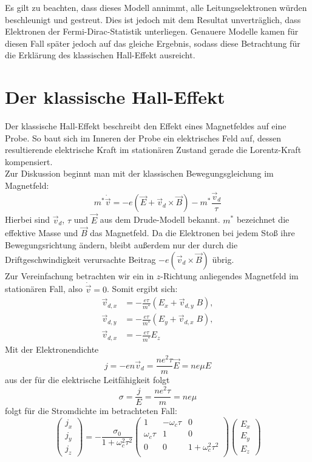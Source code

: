 Es gilt zu beachten, dass dieses Modell annimmt, alle Leitungselektronen würden
beschleunigt und gestreut. Dies ist jedoch mit dem Resultat unverträglich, dass
Elektronen der Fermi-Dirac-Statistik unterliegen. Genauere Modelle kamen für diesen
Fall später jedoch auf das gleiche Ergebnis, sodass diese Betrachtung für die 
Erklärung des klassischen Hall-Effekt ausreicht. \cite{hunklinger}

\section{Der klassische Hall-Effekt}

Der klassische Hall-Effekt beschreibt den Effekt eines Magnetfeldes auf eine
Probe. So baut sich im Inneren der Probe ein elektrisches Feld auf, dessen
resultierende elektrische Kraft im stationären Zustand gerade die Lorentz-Kraft
kompensiert.\\
Zur Diskussion beginnt man mit der klassischen Bewegungsgleichung im Magnetfeld:
\[
    m^* \dot{\vec{v}} = - e \left( \vec{E} + \vec{v}_d \times \vec{B} \right)
                      - m^* \frac{\vec{v}_d}{\tau}
\]
Hierbei sind $\vec{v}_d$, $\tau$ und $\vec{E}$ aus dem Drude-Modell bekannt.
$m^*$ bezeichnet die effektive Masse und $\vec{B}$ das Magnetfeld. 
Da die Elektronen bei jedem Stoß ihre Bewegungsrichtung ändern, bleibt außerdem
nur der durch die Driftgeschwindigkeit verursachte Beitrag 
$-e \left( \vec{v}_d \times \vec{B} \right)$ übrig.\\
Zur Vereinfachung betrachten wir ein in $z$-Richtung anliegendes Magnetfeld
im stationären Fall, also $\dot{\vec{v}} = 0$. Somit ergibt sich:
\begin{align*}
    \vec{v}_{d,x} &= - \frac{e \tau}{m^*} \left( E_x + \vec{v}_{d,y} \; B \right),\\
    \vec{v}_{d,y} &= - \frac{e \tau}{m^*} \left( E_y + \vec{v}_{d,x} \; B \right),\\
    \vec{v}_{d,x} &= - \frac{e \tau}{m^*} E_z
\end{align*}
Mit der Elektronendichte
\[
    j = -e n \vec{v}_d = \frac{n e^2 \tau}{m} \vec{E} = n e \mu E
\]
aus der für die elektrische Leitfähigkeit folgt
\[
    \sigma = \frac{j}{E} = \frac{n e^2 \tau}{m} = n e \mu
\]
folgt für die Stromdichte im betrachteten Fall:
\[
    \begin{pmatrix}
        j_x\\ j_y \\ j_z
    \end{pmatrix} 
    = - \frac{\sigma_0}{1 + \omega_c^2 \tau^2}
      \begin{pmatrix}
          1             & -\omega_c \tau    & 0 \\
          \omega_c \tau & 1                 & 0 \\
          0             & 0                 & 1+\omega_c^2 \tau^2 \\
      \end{pmatrix}
      \begin{pmatrix}
          E_x \\ E_y \\ E_z
      \end{pmatrix}
\]
